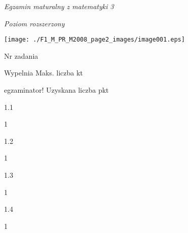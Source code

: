 \documentclass[a4paper,12pt]{article}
\begin{document}
{\it Egzamin maturalny z matematyki 3}

{\it Poziom rozszerzony}
\begin{center}
\texttt{[image: ./F1\_M\_PR\_M2008\_page2\_images/image001.eps]}
\end{center}
Nr zadania

Wypelnia Maks. liczba kt

egzaminator! Uzyskana liczba pkt

1.1

1

1.2

1

1.3

1

1.4

1
\end{document}
